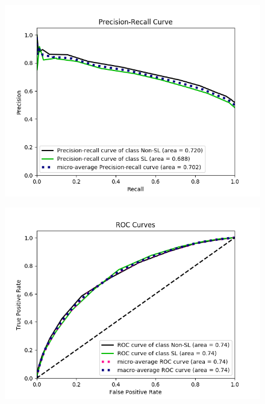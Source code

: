 \begin{figure}[t!]
\centering
%
\includegraphics[width=.48\textwidth]{figs/pr-curve}
%
\end{figure}



\begin{figure}[t!]
\centering
%
\includegraphics[width=.48\textwidth]{figs/testplot}
%
\end{figure}


